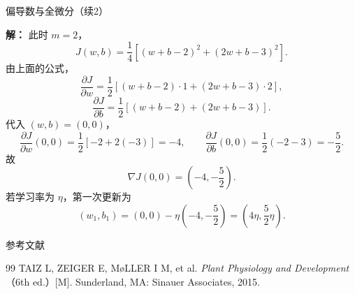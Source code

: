 \documentclass[aspectratio=169,10pt,fontset=fandol]{ctexbeamer}
\renewenvironment{solution}{\par\noindent\textbf{解：}\quad}{\par}
\begin{document}
\begin{frame}[t,fragile]{偏导数与全微分（续2）}
\footnotesize
{\footnotesize
\begin{application}[偏导数在多参数机器学习模型中的应用]

	\begin{solution}
		此时 $m=2$，
		\[
		J(w,b)=\frac14\left[(w+b-2)^2+(2w+b-3)^2\right].
		\]
		由上面的公式，
		\[
		\frac{\partial J}{\partial w}
		=\frac12\left[(w+b-2)\cdot1+(2w+b-3)\cdot2\right],
		\]
		\[
		\frac{\partial J}{\partial b}
		=\frac12\left[(w+b-2)+(2w+b-3)\right].
		\]
		代入 $(w,b)=(0,0)$，
		\[
		\frac{\partial J}{\partial w}(0,0)=\frac12[-2+2(-3)]=-4,\qquad
		\frac{\partial J}{\partial b}(0,0)=\frac12(-2-3)=-\frac52.
		\]
		故
		\[
		\nabla J(0,0)=\left(-4,-\frac52\right).
		\]
		若学习率为 $\eta$，第一次更新为
		\[
		(w_1,b_1)=\left(0,0\right)-\eta\left(-4,-\frac52\right)
		=\left(4\eta,\frac52\eta\right).
		\]
	\end{solution}
	
	
	
	
\end{application}
}
\end{frame}
\begin{frame}[t,fragile]{参考文献}
\normalsize
{\normalsize
\begin{thebibliography}{99}
 TAIZ L, ZEIGER E, M{\o}LLER I M, et al. \emph{Plant Physiology and Development}（6th ed.）[M]. Sunderland, MA: Sinauer Associates, 2015.
\end{thebibliography}
}
\end{frame}
\end{document}
